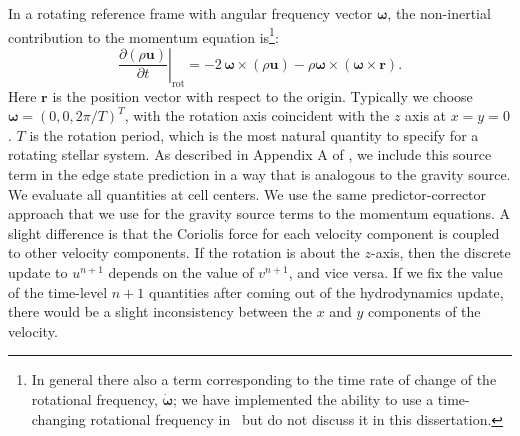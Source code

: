 \documentclass[12pt]{article}
\begin{document}
In a rotating reference frame with angular frequency vector $\bm{\omega}$,
the non-inertial contribution to the momentum equation is\footnote{In general there
also a term corresponding to the time rate of change of the rotational frequency,
$\dot{\bm{\omega}}$; we have implemented the ability to use a time-changing
rotational frequency in \castro\ but do not discuss it in this dissertation.}:
\begin{equation}
  \left.\frac{\partial(\rho \mathbf{u})}{\partial t}\right|_{\text{rot}} = -2\, {\bm\omega} \times (\rho\mathbf{u}) - \rho {\bm\omega} \times \left({\bm\omega} \times \mathbf{r}\right).
\end{equation}
Here $\mathbf{r}$ is the position vector with respect to the origin. Typically we choose $\bm{\omega} = (0, 0, 2\pi / T)^T$,
with the rotation axis coincident with the $z$ axis at $x = y = 0$.
$T$ is the rotation period, which is the most natural quantity to specify
for a rotating stellar system. As described in Appendix A of \cite{wdmergerI}, we include this source term
in the edge state prediction in a way that is analogous to the gravity source.
We evaluate all quantities at cell centers. We use the same predictor-corrector 
approach that we use for the gravity source terms to the momentum equations. A slight 
difference is that the Coriolis force for each velocity component is coupled to other velocity 
components. If the rotation is about the $z$-axis, then the discrete update to 
$u^{n+1}$ depends on the value of $v^{n+1}$, and vice versa. If we fix the value of 
the time-level $n+1$ quantities after coming out of the hydrodynamics update, there 
would be a slight inconsistency between the $x$ and $y$ components of the velocity. 
\end{document}
